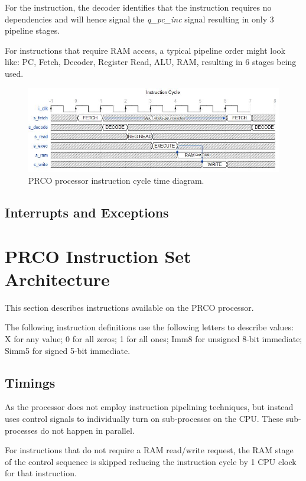 \documentclass[11pt,a4paper]{article}
\newcommand{\scname}{PRCO}
\begin{document}
For the {} instruction, the decoder identifies that the instruction requires no dependencies and will hence signal the \textit{q\_pc\_inc} signal resulting in only 3 pipeline stages.

For instructions that require RAM access, a typical pipeline order might look like: PC, Fetch, Decoder, Register Read, ALU, RAM, resulting in 6 stages being used.

\begin{figure}[H]
\begin{center}
\includegraphics[scale=0.8]{td_instr}
\end{center}
\caption{\scname{} processor instruction cycle time diagram.}
\label{fig:dft_algorithm}
\end{figure}

\newpage
\subsection{Interrupts and Exceptions}\label{sect:interrupts}

\newpage
\section{\scname{} Instruction Set Architecture}
This section describes instructions available on the \scname{} processor.

The following instruction definitions use the following letters to describe values: X for any value; 0 for all zeros; 1 for all ones; Imm8 for unsigned 8-bit immediate; Simm5 for signed 5-bit immediate.

\subsection{Timings}\label{sect:isa_timings}
As the processor does not employ instruction pipelining techniques, but instead uses control signals to individually turn on sub-processes on the CPU. These sub-processes do not happen in parallel. 

For instructions that do not require a RAM read/write request, the RAM stage of the control sequence is skipped reducing the instruction cycle by 1 CPU clock for that instruction.
\end{document}
